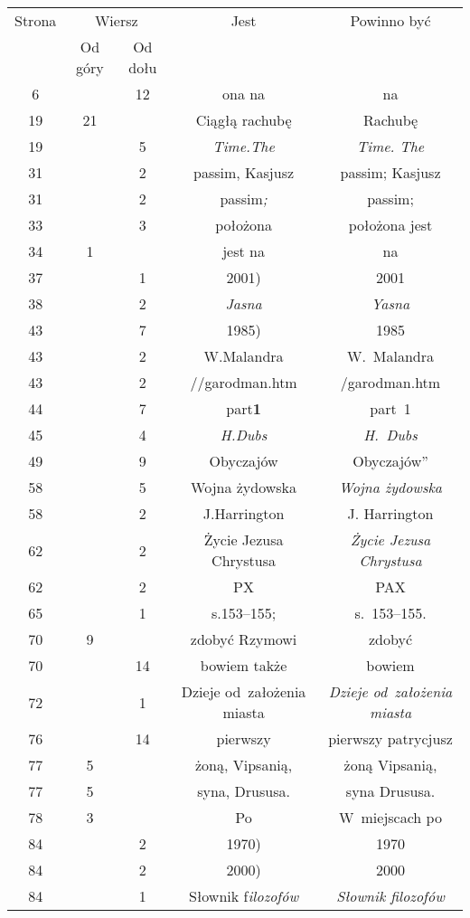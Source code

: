 \documentclass[a4paper,11pt]{article}
\begin{document}
\begin{center}

  \begin{tabular}{|c|c|c|c|c|}
    \hline
    Strona & \multicolumn{2}{c|}{Wiersz} & Jest
                              & Powinno być \\ \cline{2-3}
    & Od góry & Od dołu & & \\
    \hline
    6   & & 12 & ona na & na \\
    19  & 21 & & Ciągłą rachubę & Rachubę \\
    19  & &  5 & \textit{Time.The} & \textit{Time. The} \\
    31  & &  2 & passim, Kasjusz & passim; Kasjusz \\
    31  & &  2 & passim\textit{;} & passim; \\
    33  & &  3 & położona & położona jest \\
    34  &  1 & & jest na & na \\
    37  & &  1 & 2001) & 2001 \\
    38  & &  2 & \textit{Jasna} & \textit{Yasna} \\
    43  & &  7 & 1985) & 1985 \\
    43  & &  2 & W.Malandra & W.~Malandra \\
    43  & &  2 & //garodman.htm & /garodman.htm \\
    44  & &  7 & part\textbf{1} & part~1 \\
    45  & &  4 & \textit{H.Dubs} & \textit{H.~Dubs} \\
    49  & &  9 & Obyczajów & Obyczajów” \\
    58  & &  5 & Wojna żydowska & \textit{Wojna żydowska} \\
    58  & &  2 & J.Harrington & J. Harrington \\
    62  & &  2 & Życie Jezusa Chrystusa & \textit{Życie Jezusa Chrystusa} \\
    62  & &  2 & PX & PAX \\
    65  & &  1 & s.153--155; & s.~153--155. \\
    70  &  9 & & zdobyć Rzymowi & zdobyć \\
    70  & & 14 & bowiem także & bowiem \\
    72  & &  1 &  Dzieje od~założenia miasta
           & \textit{Dzieje od~założenia miasta} \\
    76  & & 14 & pierwszy & pierwszy patrycjusz \\
    77  &  5 & & żoną, Vipsanią, & żoną Vipsanią, \\
    77  &  5 & & syna, Drususa. & syna Drususa. \\
    78  &  3 & & Po & W~miejscach po \\
    84  & &  2 & 1970) & 1970 \\
    84  & &  2 & 2000) & 2000 \\
    84  & &  1 & Słownik f\textit{ilozofów} & \textit{Słownik filozofów} \\
    \hline
  \end{tabular}






\end{center}
\end{document}
